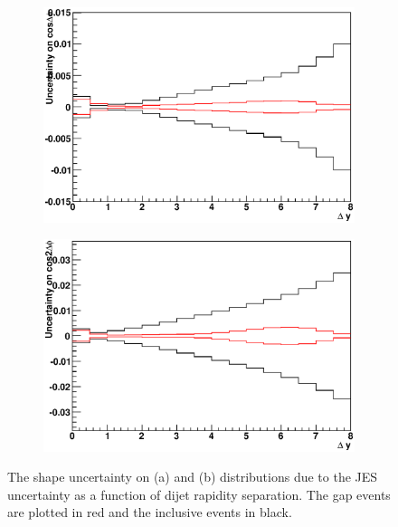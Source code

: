 \begin{figure}
\centering
        \begin{subfigure}[b]{0.5\textwidth}
                \centering
                \includegraphics[width=\textwidth]{figures/GBJ2/JES/Smeared__cosdPhi_deltaY_gap.eps}
        \end{subfigure}%
        \begin{subfigure}[b]{0.5\textwidth}
                \centering
                \includegraphics[width=\textwidth]{figures/GBJ2/JES/Smeared__cos2dPhi_deltaY_gap.eps}
        \end{subfigure}%
\caption[Uncertainty bands due to the JES uncertainty for \mean{\cosdphi{}} and  \mean{\costwodphi{}}]{
The shape uncertainty on (a) \mean{\cosdphi{}} and (b) \mean{\costwodphi{}} distributions due to the JES uncertainty as a function of dijet rapidity separation.
The gap events are plotted in red and the inclusive events in black.
\label{GBJ2:JES:cos}}
\end{figure}


